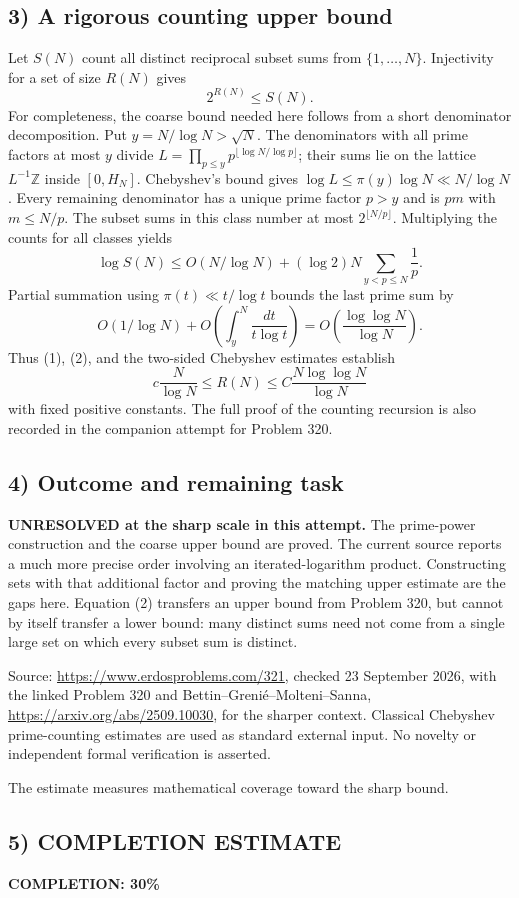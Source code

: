 \subsection*{3) A rigorous counting upper bound}
Let $S(N)$ count all distinct reciprocal subset sums from $\{1,\ldots,N\}$. Injectivity for a set of size $R(N)$ gives
\[2^{R(N)}\le S(N).\tag{2}\]
For completeness, the coarse bound needed here follows from a short denominator decomposition. Put $y=N/\log N>\sqrt N$. The denominators with all prime factors at most $y$ divide $L=\prod_{p\le y}p^{\lfloor\log N/\log p\rfloor}$; their sums lie on the lattice $L^{-1}\mathbb Z$ inside $[0,H_N]$. Chebyshev's bound gives $\log L\le\pi(y)\log N\ll N/\log N$. Every remaining denominator has a unique prime factor $p>y$ and is $pm$ with $m\le N/p$. The subset sums in this class number at most $2^{\lfloor N/p\rfloor}$. Multiplying the counts for all classes yields
\[\log S(N)\le O(N/\log N)+(\log2)N\sum_{y<p\le N}\frac1p.
\]
Partial summation using $\pi(t)\ll t/\log t$ bounds the last prime sum by
\[O(1/\log N)+O\!\left(\int_y^N\frac{dt}{t\log t}\right)
=O\!\left(\frac{\log\log N}{\log N}\right).
\]
Thus (1), (2), and the two-sided Chebyshev estimates establish
\[c\frac N{\log N}\le R(N)\le C\frac{N\log\log N}{\log N}
\]
with fixed positive constants. The full proof of the counting recursion is also recorded in the companion attempt for Problem 320.

\subsection*{4) Outcome and remaining task}
\textbf{UNRESOLVED at the sharp scale in this attempt.} The prime-power construction and the coarse upper bound are proved. The current source reports a much more precise order involving an iterated-logarithm product. Constructing sets with that additional factor and proving the matching upper estimate are the gaps here. Equation (2) transfers an upper bound from Problem 320, but cannot by itself transfer a lower bound: many distinct sums need not come from a single large set on which every subset sum is distinct.

Source: \url{https://www.erdosproblems.com/321}, checked 23 September 2026, with the linked Problem 320 and Bettin--Greni\'e--Molteni--Sanna, \url{https://arxiv.org/abs/2509.10030}, for the sharper context. Classical Chebyshev prime-counting estimates are used as standard external input. No novelty or independent formal verification is asserted.

The estimate measures mathematical coverage toward the sharp bound.
\subsection*{5) COMPLETION ESTIMATE}
\textbf{COMPLETION: 30\%}
